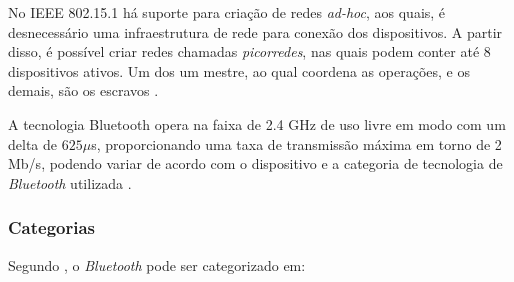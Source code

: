 
No IEEE 802.15.1 há suporte para criação de redes \textit{ad-hoc}, aos quais, é desnecessário uma infraestrutura de rede para conexão dos dispositivos. A partir disso, é possível criar redes chamadas \textit{picorredes}, nas quais podem conter até 8 dispositivos ativos. Um dos  um mestre, ao qual coordena as operações, e os demais, são os escravos \cite{BluetoothSIG2017, Kurose2012}.

A tecnologia Bluetooth opera na faixa  de 2.4 GHz de uso livre em modo  com um delta de $625\mu$s, proporcionando uma taxa de transmissão máxima em torno de 2 Mb/s, podendo variar de acordo com o dispositivo e a categoria de tecnologia de \textit{Bluetooth} utilizada \cite{BluetoothSIG2017}.


\subsubsection{Categorias}

Segundo , o \textit{Bluetooth} pode ser categorizado em:

